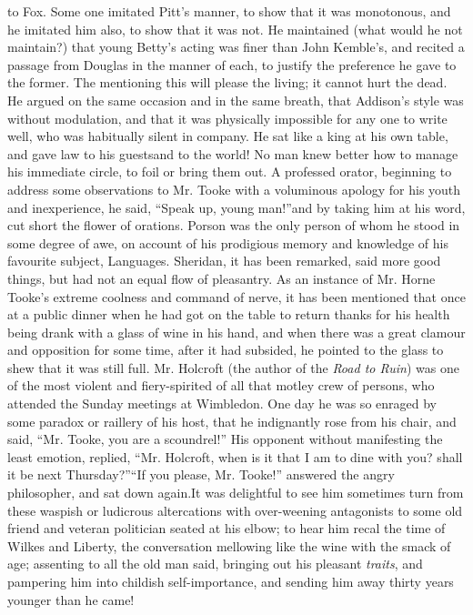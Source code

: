 to Fox. Some one imitated Pitt's manner, to show that it was
monotonous, and he imitated him also, to show that it was not. He
maintained (what would he not maintain?) that young Betty's acting
was finer than John Kemble's, and recited a passage from Douglas
in the manner of each, to justify the preference he gave to the
former. The mentioning this will please the living; it cannot hurt
the dead. He argued on the same occasion and in the same breath,
that Addison's style was without modulation, and that it was
physically impossible for any one to write well, who was
habitually silent in company. He sat like a king at his own table,
and gave law to his guests\textemdash and to the world! No man knew better
how to manage his immediate circle, to foil or bring them out. A
professed orator, beginning to address some observations to
Mr. Tooke with a voluminous apology for his youth and
inexperience, he said, ``Speak up, young man!''\textemdash and by taking him
at his word, cut short the flower of orations. Porson was the only
person of whom he stood in some degree of awe, on account of his
prodigious memory and knowledge of his favourite subject,
Languages. Sheridan, it has been remarked, said more good things,
but had not an equal flow of pleasantry. As an instance of
Mr. Horne Tooke's extreme coolness and command of nerve, it has
been mentioned that once at a public dinner when he had got on the
table to return thanks for his health being drank with a glass of
wine in his hand, and when there was a great clamour and
opposition for some time, after it had subsided, he pointed to the
glass to shew that it was still full. Mr. Holcroft (the author of
the \emph{Road to Ruin}) was one of the most violent and fiery-spirited
of all that motley crew of persons, who attended the Sunday
meetings at Wimbledon. One day he was so enraged by some paradox
or raillery of his host, that he indignantly rose from his chair,
and said, ``Mr. Tooke, you are a scoundrel!'' His opponent without
manifesting the least emotion, replied, ``Mr. Holcroft, when is it
that I am to dine with you? shall it be next Thursday?''\textemdash ``If you
please, Mr.  Tooke!'' answered the angry philosopher, and sat down
again.\textemdash It was delightful to see him sometimes turn from these
waspish or ludicrous altercations with over-weening antagonists to
some old friend and veteran politician seated at his elbow; to
hear him recal the time of Wilkes and Liberty, the conversation
mellowing like the wine with the smack of age; assenting to all
the old man said, bringing out his pleasant \emph{traits}, and
pampering him into childish self-importance, and sending him away
thirty years younger than he came!

